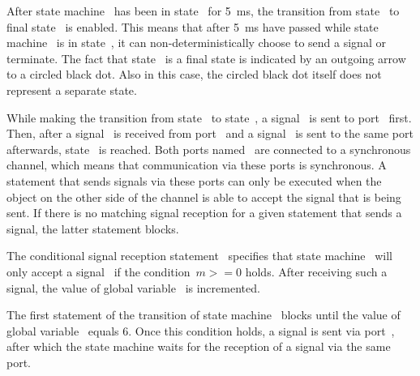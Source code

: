 After state machine~ has been in state~ for 5~ms, the transition from state~ to final state~ is enabled.
This means that after 5~ms have passed while state machine~ is in state~, it can non-deterministically choose to send a signal or terminate.
The fact that state~ is a final state is indicated by an outgoing arrow to a circled black dot.
Also in this case, the circled black dot itself does not represent a separate state.

While making the transition from state~ to state~, a signal~ is sent to port~ first.
Then, after a signal~ is received from port~ and a signal~ is sent to the same port afterwards, state~ is reached.
Both ports named~ are connected to a synchronous channel, which means that communication via these ports is synchronous.
A statement that sends signals via these ports can only be executed when the object on the other side of the channel is able to accept the signal that is being sent.
If there is no matching signal reception for a given statement that sends a signal, the latter statement blocks.

The conditional signal reception statement~ specifies that state machine~ will only accept a signal~ if the condition~$m>=0$ holds.
After receiving such a signal, the value of global variable~ is incremented.

The first statement of the transition of state machine~ blocks until the value of global variable~ equals 6.
Once this condition holds, a signal is sent via port~, after which the state machine waits for the reception of a signal via the same port.



